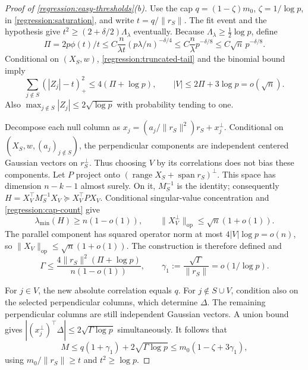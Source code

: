 \begin{proof}[Proof of \cref{regression:easy-thresholds}(b)]
Use the cap $q=(1-\zeta)m_0$, $\zeta=1/\log p$, in
\eqref{regression:saturation}, and write $t=q/\|r_S\|$.
The fit event and the hypothesis give
$t^2\geq(2+\delta/2)\Lambda_\lambda$ eventually.
Because $\Lambda_\lambda\geq\frac12\log p$, define
\[
 \Pi=2p\phi(t)/t
 \leq C\frac{n}{\lambda t}(p\lambda/n)^{-\delta/4}
 \leq C\frac n\lambda p^{-\delta/8}
 \leq C\sqrt n\,p^{-\delta/8}.
\]
Conditional on $(X_S,w)$, \eqref{regression:truncated-tail}
and the binomial bound imply
\begin{equation}\label{regression:cap-count}
 \sum_{j\notin S}(|Z_j|-t)_+^2\leq4(\Pi+\log p),\qquad
 |V|\leq2\Pi+3\log p=o(\sqrt n).
\end{equation}
Also $\max_{j\notin S}|Z_j|\leq2\sqrt{\log p}$ with probability
tending to one.

Decompose each null column as
$x_j=(a_j/\|r_S\|^2)r_S+x_j^\perp$.
Conditional on $(X_S,w,(a_j)_{j\notin S})$, the perpendicular
components are independent centered Gaussian vectors on $r_S^\perp$.
Thus choosing $V$ by its correlations does not bias these components.
Let $P$ project onto
$(\operatorname{range}X_S+\operatorname{span}r_S)^\perp$.
This space has dimension $n-k-1$ almost surely. On it,
$M_S^{-1}$ is the identity; consequently
$H=X_V^\top M_S^{-1}X_V\succeq X_V^\top PX_V$.
Conditional singular-value concentration and
\eqref{regression:cap-count} give
\[
 \lambda_{\min}(H)\geq n(1-o(1)),\qquad
 \|X_V^\perp\|_{\mathrm{op}}\leq\sqrt n(1+o(1)).
\]
The parallel component has squared operator norm at most
$4|V|\log p=o(n)$, so $\|X_V\|_{\mathrm{op}}\leq\sqrt n(1+o(1))$.
The construction is therefore defined and
\begin{equation}\label{regression:gamma-est}
 \Gamma\leq\frac{4\|r_S\|^2(\Pi+\log p)}{n(1-o(1))},\qquad
 \gamma_1:=\frac{\sqrt\Gamma}{\|r_S\|}
          =o(1/\log p).
\end{equation}

For $j\in V$, the new absolute correlation equals $q$.
For $j\notin S\cup V$, condition also on the selected perpendicular
columns, which determine $\Delta$. The remaining perpendicular
columns are still independent Gaussian vectors. A union bound gives
$|(x_j^\perp)^\top\Delta|\leq2\sqrt{\Gamma\log p}$ simultaneously.
It follows that
\[
 M\leq q(1+\gamma_1)+2\sqrt{\Gamma\log p}
       \leq m_0(1-\zeta+3\gamma_1),
\]
using $m_0/\|r_S\|\geq t$ and $t^2\geq\log p$.


\end{proof}
